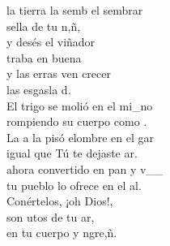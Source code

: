 \documentclass[12pt]{article}
\begin{document}
\begin{multicols*}{2}
\begin{cancion}[El sembrador][]%
	 la tierra la semb el sembrar \\
	 sella de tu n,ñ,  \\
	y desés el viñador \\
	traba en buena  \\
	y las erras ven crecer \\
	las esgasla d.\\
	El trigo se molió en el mi_no\\
	rompiendo su cuerpo como .\\
	La a la pisó elombre en el gar\\
	igual que Tú te dejaste ar.\\
	ahora convertido en pan y v__\\
	tu pueblo lo ofrece en el al.\\
	Conértelos, ¡oh Dios!,\\
	son utos de tu ar,\\
	en tu cuerpo y ngre,ñ. \\
\end{cancion}%


\end{multicols*}
\end{document}
